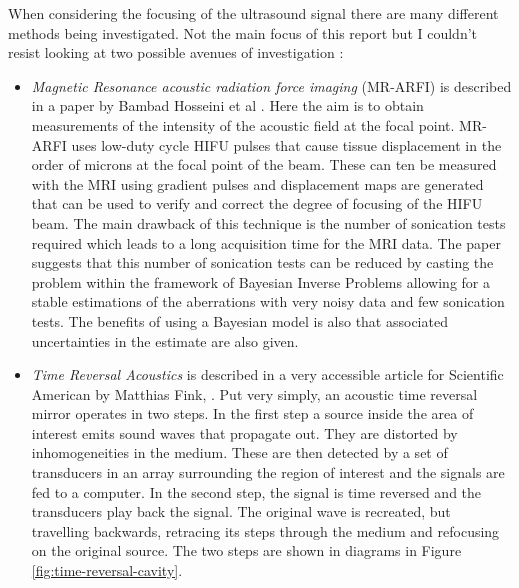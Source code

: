 \documentclass[11pt]{article} %
\begin{document}
	When considering the focusing of the ultrasound signal there are many different methods being investigated. Not the main focus of this report but I couldn't resist looking at two possible avenues of investigation : 
	\begin{itemize}
		\item  \textit{Magnetic Resonance acoustic radiation force imaging} (MR-ARFI) is described in a paper by Bambad Hosseini et al	\cite{Hosseini2018}. Here the aim is to obtain measurements of the intensity of the acoustic field at the focal point. MR-ARFI uses low-duty cycle HIFU pulses that cause tissue displacement in the order of microns at the focal point of the beam. These can ten be measured with the MRI using gradient pulses and displacement maps are generated that can be used to verify and correct the degree of focusing of the HIFU beam. The main drawback of this technique is the number of sonication tests required which leads to a long acquisition time for the MRI data. The paper suggests that this number of sonication tests can be reduced by casting the problem within the framework of Bayesian Inverse Problems allowing for a stable estimations of the aberrations with very noisy data and few sonication tests. The benefits of using a Bayesian model is also that associated uncertainties in the estimate are also given.
		\item \textit{Time Reversal Acoustics} is described in a very accessible article for Scientific American by Matthias Fink, \cite{Fink1999}. Put very simply, an acoustic time reversal mirror operates in two steps. In the first step a source inside the area of interest emits sound waves that propagate out. They are distorted by inhomogeneities in the medium. These are then detected by a set of transducers in an array surrounding the region of interest and the signals are fed to a computer. In the second step, the signal is time reversed and the transducers play back the signal. The original wave is recreated, but travelling backwards, retracing its steps through the medium and refocusing on the original source.  The two steps are shown in diagrams in Figure \ref{fig:time-reversal-cavity}. 
		

\end{itemize}
\end{document}
